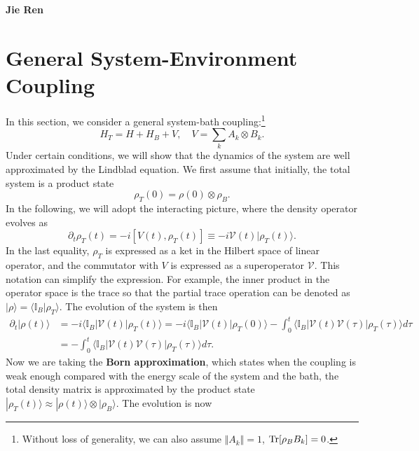 \documentclass{SciPost}
\begin{document}
\pagestyle{SPstyle}

\begin{center}{\Large \textbf{\color{scipostdeepblue}{
Master Equation\\
}}}\end{center}

\begin{center}
\textbf{Jie Ren}
\end{center}

\tableofcontents

\section{General System-Environment Coupling}

In this section, we consider a general system-bath coupling:\footnote{Without loss of generality, we can also assume $\Vert A_k \Vert =1$, $\operatorname{Tr}[\rho_B B_k]=0$.}
\begin{equation}
	H_T = H + H_B + V, \quad V = \sum_k A_k \otimes B_k.
\end{equation}
Under certain conditions, we will show that the dynamics of the system are well approximated by the Lindblad equation. We first assume that initially, the total system is a product state 
$$\rho_T(0) = \rho(0) \otimes \rho_B.$$ 
In the following, we will adopt the interacting picture, where the density operator evolves as 
$$\partial_t \rho_T(t) = -i[V(t), \rho_T(t)] \equiv -i\mathcal V(t) |\rho_T(t) \rangle.$$
In the last equality, $\rho_T$ is expressed as a ket in the Hilbert space of linear operator, and the commutator with $V$ is expressed as a superoperator $\mathcal V$. This notation can simplify the expression. For example, the inner product in the operator space is the trace so that the partial trace operation can be denoted as $|\rho\rangle = \langle \mathbb I_B|\rho_T\rangle$. The evolution of the system is then 
\begin{equation}
\begin{aligned}
	\partial_t |\rho(t)\rangle &= -i \langle \mathbb I_B|\mathcal V(t) |\rho_T(t)\rangle 
	= -i \langle \mathbb I_B|\mathcal{V}(t) |\rho_T(0)\rangle - \int_0^t \langle \mathbb I_B| \mathcal{V}(t) \mathcal{V}(\tau) |\rho_T(\tau)\rangle d\tau \\
	&= - \int_0^t \langle \mathbb I_B| \mathcal{V}(t) \mathcal{V}(\tau) |\rho_T(\tau)\rangle d\tau.
\end{aligned}
\end{equation}
Now we are taking the \textbf{Born approximation}, which states when the coupling is weak enough compared with the energy scale of the system and the bath, the total density matrix is approximated by the product state $|\rho_T(t)\rangle \approx |\rho(t)\rangle \otimes |\rho_B\rangle$. The evolution is now
\end{document}
